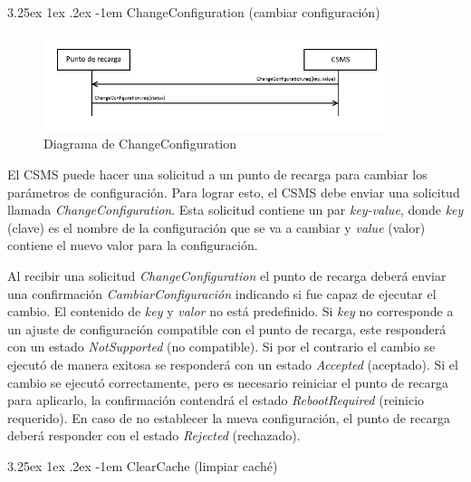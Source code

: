 \documentclass[12pt,a4paper,onecolumn,oneside]{report}
\makeatletter
\newcounter{subsubsubsection}[subsubsection]
\renewcommand\paragraph{\@startsection{paragraph}{5}{\z@}%
  {3.25ex \@plus1ex \@minus.2ex}%
  {-1em}%
  {\normalfont\normalsize\bfseries}}
\makeatother
\begin{document}
\label{Operaciones iniciadas por el CSMS}


\paragraph{ChangeConfiguration (cambiar configuración)}
\label{ChangeConfiguration (cambiar configuración)}


\begin{figure}[H] 
\centering
  \includegraphics[width=0.9\textwidth]{figuras/diagramachangeconfiguration.png}
  \caption[Diagrama de \textit{ChangeConfiguration}]{Diagrama de ChangeConfiguration\\
  }
  \label{fig:diagramachangeconfiguration}
\end{figure}

El CSMS puede hacer una solicitud a un punto de recarga para cambiar los parámetros de configuración. Para lograr esto, el CSMS debe enviar una solicitud llamada \textit{ChangeConfiguration}. Esta solicitud contiene un par \textit{key-value}, donde \textit{key} (clave) es el nombre de la configuración que se va a cambiar y \textit{value} (valor) contiene el nuevo valor para la configuración.

Al recibir una solicitud \textit{ChangeConfiguration} el punto de recarga deberá enviar una confirmación \textit{CambiarConfiguración} indicando si fue capaz de ejecutar el cambio. El contenido de \textit{key} y \textit{valor} no está predefinido. Si \textit{key} no corresponde a un ajuste de configuración compatible con el punto de recarga, este responderá con un estado \textit{NotSupported} (no compatible). Si por el contrario el cambio se ejecutó de manera exitosa se responderá con un estado \textit{Accepted} (aceptado). Si el cambio se ejecutó correctamente, pero es necesario reiniciar el punto de recarga para aplicarlo, la confirmación contendrá el estado \textit{RebootRequired} (reinicio requerido). En caso de no establecer la nueva configuración, el punto de recarga deberá responder con el estado \textit{Rejected} (rechazado).


\paragraph{ClearCache (limpiar caché)}
\label{ClearCache (limpiar caché)}
\end{document}
